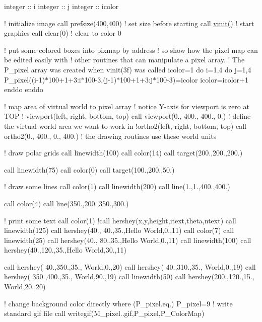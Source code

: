 integer \+:\+: i integer \+:\+: j integer \+:\+: icolor

! initialize image call prefsize(400,400) ! set size before starting call \hyperlink{namespacem__pixel_ac03ca8f23fdadb60599b6ea4dc87a6d9}{vinit()} ! start graphics call clear(0) ! clear to color 0

! put some colored boxes into pixmap by address ! so show how the pixel map can be edited easily with ! other routines that can manipulate a pixel array. ! The P\+\_\+pixel array was created when vinit(3f) was called icolor=1 do i=1,4 do j=1,4 P\+\_\+pixel((i-\/1)$\ast$100+1+3\+:i$\ast$100-\/3,(j-\/1)$\ast$100+1+3\+:j$\ast$100-\/3)=icolor icolor=icolor+1 enddo enddo

! map area of virtual world to pixel array ! notice Y-\/axis for viewport is zero at T\+OP ! viewport(left, right, bottom, top) call viewport(0., 400., 400., 0.) ! define the virtual world area we want to work in !ortho2(left, right, bottom, top) call ortho2(0., 400., 0., 400.) ! the drawing routines use these world units

! draw polar grids call linewidth(100) call color(14) call target(200.,200.,200.)

call linewidth(75) call color(0) call target(100.,200.,50.)

! draw some lines call color(1) call linewidth(200) call line(1.,1.,400.,400.)

call color(4) call line(350.,200.,350.,300.)

! print some text call color(1) !call hershey(x,y,height,itext,theta,ntext) call linewidth(125) call hershey(40., 40.,35.,\textquotesingle{}Hello World\textquotesingle{},0.,11) call color(7) call linewidth(25) call hershey(40., 80.,35.,\textquotesingle{}Hello World\textquotesingle{},0.,11) call linewidth(100) call hershey(40.,120.,35.,\textquotesingle{}Hello World\textquotesingle{},30.,11)

call hershey( 40.,350.,35.,\textquotesingle{} World\textquotesingle{},0.,20) call hershey( 40.,310.,35.,\textquotesingle{} World\textquotesingle{},0.,19) call hershey( 350.,400.,35.,\textquotesingle{} World\textquotesingle{},90.,19) call linewidth(50) call hershey(200.,120.,15.,\textquotesingle{} World\textquotesingle{},20.,20)

! change background color directly where (P\+\_\+pixel.\+eq.) P\+\_\+pixel=9 ! write standard gif file call writegif(\textquotesingle{}M\+\_\+pixel..\+gif\textquotesingle{},P\+\_\+pixel,P\+\_\+\+Color\+Map)

